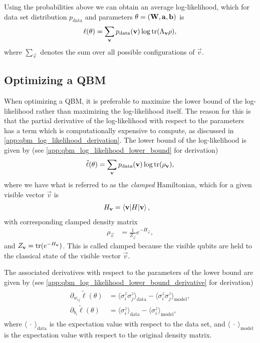 Using the probabilities above we can obtain an average log-likelihood, which for data set distribution \( p_\text{data} \) and parameters \( \theta = (\mathbf{W}, \mathbf{a}, \mathbf{b}) \) is
\begin{align}
    \ell(\theta) = \sum_{\mathbf{v}} p_{\text{data}}(\mathbf{v}) \log \text{tr}(\Lambda_{\mathbf{v}}\rho),
\end{align}
where \( \sum_{\vec{v}} \) denotes the sum over all possible configurations of \( \vec{v} \).

\subsection{Optimizing a QBM}
When optimizing a QBM, it is preferable to maximize the lower bound of the log-likelihood rather than maximizing the log-likelihood itself.
The reason for this is that the partial derivative of the log-likelihood with respect to the parameters has a term which is computationally expensive to compute, as discussed in \cref{app:qbm_log_likelihood_derivation}.
The lower bound of the log-likelihood is given by (see \cref{app:qbm_log_likelihood_lower_bound} for derivation)
\begin{align}
    \tilde{\ell}(\theta) = \sum_{\mathbf{v}} p_{\text{data}}(\mathbf{v}) \log \text{tr}(\rho_{\mathbf{v}}),
\end{align}
where we have what is referred to as the \textit{clamped} Hamiltonian, which for a given visible vector \( \vec{v} \) is
\begin{align}
    H_{\mathbf{v}}
        &= \braket{\mathbf{v}|H|\mathbf{v}},
\end{align}
with corresponding clamped density matrix
\begin{align}
    \rho_\vec{v}
        &= \frac{1}{Z_\vec{v}} e^{-H_\vec{v}},
\end{align}
and \( Z_{\mathbf{v}} = \text{tr}(e^{-H_{\mathbf{v}}}) \).
This is called clamped because the visible qubits are held to the classical state of the visible vector \( \vec{v} \).

The associated derivatives with respect to the parameters of the lower bound are given by (see \cref{app:qbm_log_likelihood_lower_bound_derivative} for derivation)
\begin{align}
\begin{split}
    \partial_{w_{ij}} \tilde{\ell}(\theta)
        &= \langle \sigma_i^z \sigma_j^z \rangle_\text{data} - \langle \sigma_i^z \sigma_j^z \rangle_\text{model}, \\
    \partial_{b_i} \tilde{\ell}(\theta)
        &= \langle \sigma_i^z \rangle_\text{data} - \langle \sigma_i^z \rangle_\text{model},
\end{split}
\end{align}
where \( \langle \ \cdot \ \rangle_\text{data} \) is the expectation value with respect to the data set, and \( \langle \ \cdot \ \rangle_\text{model} \) is the expectation value with respect to the original density matrix.

